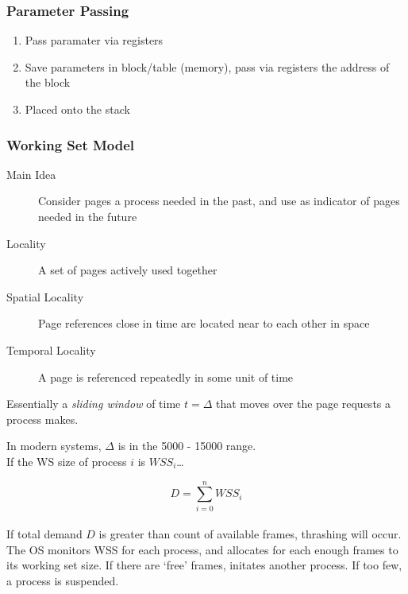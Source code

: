 \documentclass[a4paper]{article}
\begin{document}
\begin{multicols*}{2}
    \vspace*{-1em}
    \subsubsection*{Parameter Passing}
    \setlength{\leftmargini}{2em}
    \begin{enumerate}
        \item Pass paramater via registers
        \item Save parameters in block/table (memory), pass via registers the
              address of the block
        \item Placed onto the stack
    \end{enumerate}
    \subsubsection*{Working Set Model}
    \begin{description}
        \item[Main Idea] Consider pages a process needed in the past, and
            use as indicator of pages needed in the future
        \item[Locality] A set of pages actively used together
        \item[Spatial Locality] Page references close in time are located near
            to each other in space
        \item[Temporal Locality] A page is referenced repeatedly in some unit of time
    \end{description}

    Essentially a \emph{sliding window} of time \(t = \Delta\) that moves over the page
    requests a process makes.

    \begin{multicols*}{2}
        In modern systems, \(\Delta\) is in the 5000 - 15000 range. \\
        If the WS size of process \(i\) is \(WSS_i\)\dots

        \begin{equation*}
            D = \sum_{i=0}^{n} WSS_i
        \end{equation*}
        \columnbreak \\
        If total demand \(D\) is greater than count of available frames,
        thrashing will occur. \\
        The OS monitors WSS for each process, and
        allocates for each enough frames to its working set size. If there are
        `free' frames, initates another process. If too few, a process is
        suspended.
    \end{multicols*}


\end{multicols*}
\end{document}
